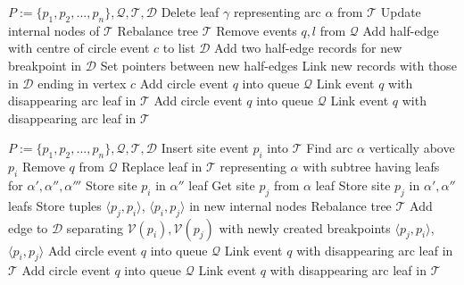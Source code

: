 \documentclass[skorowidz,autorrok,backref,xodstep,oswiadczenie]{wmimgr}
\begin{document}
\begin{algorithm}
\caption{$HandleCircleEvent(\gamma)$ \cite{geometria}}
\label{HandleCircleEvent}
\begin{algorithmic}
    \REQUIRE $P := \{p_{1}, p_{2}, ... , p_{n}\}, \mathcal{Q, T, D}$
    \STATE Delete leaf $\gamma$ representing arc $\alpha$ from $\mathcal{T}$
    \STATE Update internal nodes of $\mathcal{T}$
    \STATE Rebalance tree $\mathcal{T}$
        \STATE Remove events $q, l$ from $\mathcal{Q}$
    \ENDIF
    \STATE Add half-edge with centre of circle event $c$ to list $\mathcal{D}$
    \STATE Add two half-edge records for new breakpoint in $\mathcal{D}$
    \STATE Set pointers between new half-edges
    \STATE Link new records with those in $\mathcal{D}$ ending in vertex $c$
        \STATE Add circle event $q$ into queue $\mathcal{Q}$
        \STATE Link event $q$ with disappearing arc leaf in $\mathcal{T}$
    \ENDIF
        \STATE Add circle event $q$ into queue $\mathcal{Q}$
        \STATE Link event $q$ with disappearing arc leaf in $\mathcal{T}$
    \ENDIF
\end{algorithmic}
\end{algorithm}

\begin{algorithm}
\caption{$HandleSiteEvent(p_{i})$ \cite{geometria}}
\label{HandleSiteEvent}
\begin{algorithmic}
    \REQUIRE $P := \{p_{1}, p_{2}, ... , p_{n}\}, \mathcal{Q, T, D}$
        \STATE Insert site event $p_{i}$ into $\mathcal{T}$
    \ELSE
        \STATE Find arc $\alpha$ vertically above $p_{i}$
            \STATE Remove $q$ from $\mathcal{Q}$
        \ENDIF
        \STATE Replace leaf in $\mathcal{T}$ representing $\alpha$ with subtree having leafs for $\alpha', \alpha'', \alpha'''$
        \STATE Store site $p_{i}$ in $\alpha''$ leaf
        \STATE Get site $p_{j}$ from $\alpha$ leaf
        \STATE Store site $p_{j}$ in $\alpha', \alpha''$ leafs
        \STATE Store tuples $\langle p_{j}, p_{i}\rangle$, $\langle p_{i}, p_{j}\rangle$ in new internal nodes
            \STATE Rebalance tree $\mathcal{T}$
        \ENDIF
        \STATE Add edge to $\mathcal{D}$ separating $\mathcal{V}(p_{i}), \mathcal{V}(p_{j})$ with newly created breakpoints $\langle p_{j}, p_{i}\rangle$, $\langle p_{i}, p_{j}\rangle$
            \STATE Add circle event $q$ into queue $\mathcal{Q}$
            \STATE Link event $q$ with disappearing arc leaf in $\mathcal{T}$
        \ENDIF
            \STATE Add circle event $q$ into queue $\mathcal{Q}$
            \STATE Link event $q$ with disappearing arc leaf in $\mathcal{T}$
        \ENDIF
    \ENDIF
\end{algorithmic}
\end{algorithm}
\end{document}
